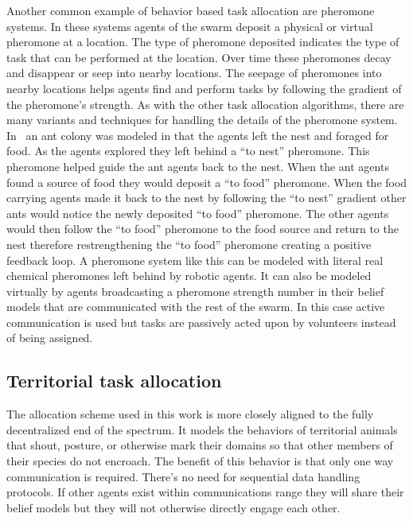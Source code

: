 Another common example of behavior based task allocation are pheromone systems.  In these systems agents of the swarm deposit a physical or virtual pheromone at a location.  The type of pheromone deposited indicates the type of task that can be performed at the location.  Over time these pheromones decay and disappear or seep into nearby locations.  The seepage of pheromones into nearby locations helps agents find and perform tasks by following the gradient of the pheromone's strength.  As with the other task allocation algorithms, there are many variants and techniques for handling the details of the pheromone system.  In~\cite{pheromone} an ant colony was modeled in that the agents left the nest and foraged for food.  As the agents explored they left behind a ``to nest'' pheromone.  This pheromone helped guide the ant agents back to the nest.  When the ant agents found a source of food they would deposit a ``to food'' pheromone.  When the food carrying agents made it back to the nest by following the ``to nest'' gradient other ants would notice the newly deposited ``to food'' pheromone.  The other agents would then follow the ``to food'' pheromone to the food source and return to the nest therefore restrengthening the ``to food'' pheromone creating a positive feedback loop.  A pheromone system like this can be modeled with literal real chemical pheromones left behind by robotic agents.  It can also be modeled virtually by agents broadcasting a pheromone strength number in their belief models that are communicated with the rest of the swarm.  In this case active communication is used but tasks are passively acted upon by volunteers instead of being assigned.

\subsection{Territorial task allocation}

The allocation scheme used in this work is more closely aligned to the fully decentralized end of the spectrum.  It models the behaviors of territorial animals that shout, posture, or otherwise mark their domains so that other members of their species do not encroach.  The benefit of this behavior is that only one way communication is required.  There's no need for sequential data handling protocols.  If other agents exist within communications range they will share their belief models but they will not otherwise directly engage each other.  

